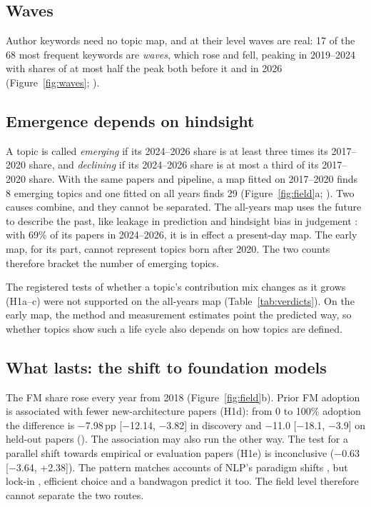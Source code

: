 \subsection{Waves}
Author keywords need no topic map, and at their level waves are real: 17 of the 68 most frequent keywords are
\emph{waves}, which rose and fell, peaking in 2019--2024 with shares of at most half the peak both before it and in
2026 (Figure~\ref{fig:waves}; ).

\subsection{Emergence depends on hindsight}
A topic is called \emph{emerging} if its 2024--2026 share is at least three times its 2017--2020 share, and
\emph{declining} if its 2024--2026 share is at most a third of its 2017--2020 share. With the same papers and pipeline,
a map fitted on 2017--2020 finds 8 emerging topics and one fitted on all years finds 29 (Figure~\ref{fig:field}a;
). Two causes combine, and they cannot be separated. The all-years map uses the future to describe the
past, like leakage in prediction \citep{kapoor2023leakage} and hindsight bias in judgement
\citep{fischhoff1975hindsight}: with 69\% of its papers in 2024--2026, it is in effect a present-day map. The early map,
for its part, cannot represent topics born after 2020. The two counts therefore bracket the number of emerging topics.

The registered tests of whether a topic's contribution mix changes as it grows (H1a--c) were not supported on the
all-years map (Table~\ref{tab:verdicts}). On the early map, the method and measurement estimates point the predicted
way, so whether topics show such a life cycle also depends on how topics are defined.

\subsection{What lasts: the shift to foundation models}
The FM share rose every year from 2018 (Figure~\ref{fig:field}b). Prior FM adoption is associated with fewer
new-architecture papers (H1d): from 0 to 100\% adoption the difference is $-$7.98\,pp [$-$12.14, $-$3.82] in discovery
and $-$11.0 [$-$18.1, $-$3.9] on held-out papers (). The association may also run the other way. The
test for a parallel shift towards empirical or evaluation papers (H1e) is inconclusive ($-$0.63 [$-$3.64, +2.38]). The
pattern matches accounts of NLP's paradigm shifts \citep{gururaja2023build,saphra2024first,pramanick2023diachronic},
but lock-in \citep{hooker2021hardware}, efficient choice \citep{sutton2019bitter} and a bandwagon
\citep{fujimura1988molecular} predict it too. The field level therefore cannot separate the two routes.

